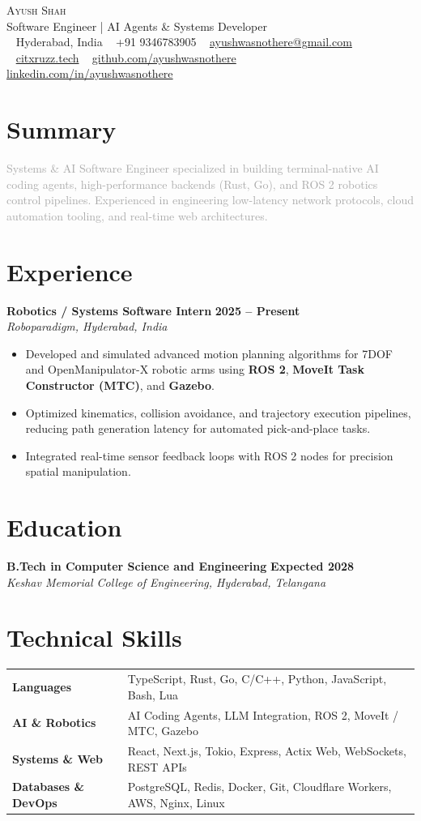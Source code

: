 \documentclass[a4paper,10pt]{article}
\makeatletter
\newcommand{\icon}[1]{\textcolor{lightgray}{#1}}
\newcommand{\resumeHeader}{
    \begin{center}
        {\Huge \scshape Ayush Shah}\\[4pt]
        \large\textcolor{midgray}{Software Engineer | AI Agents \& Systems Developer}\\[6pt]
        \small
        \icon{\faMapMarker} ~ Hyderabad, India \quad \textbullet \quad
        \icon{\faPhone} ~ +91 9346783905 \quad \textbullet \quad
        \icon{\faEnvelope} ~ \href{mailto:ayushwasnothere@gmail.com}{ayushwasnothere@gmail.com}\\[4pt]
        \icon{\faGlobe} ~ \href{https://citxruzz.tech}{citxruzz.tech} \quad \textbullet \quad
        \icon{\faGithub} ~ \href{https://github.com/ayushwasnothere}{github.com/ayushwasnothere} \quad \textbullet \quad
        \icon{\faLinkedin} ~ \href{https://linkedin.com/in/ayushwasnothere}{linkedin.com/in/ayushwasnothere}
    \end{center}
}
\makeatother
\begin{document}
\resumeHeader

\section*{Summary}
\textcolor{darkgray}{Systems & AI Software Engineer specialized in building terminal-native AI coding agents, high-performance backends (Rust, Go), and ROS 2 robotics control pipelines. Experienced in engineering low-latency network protocols, cloud automation tooling, and real-time web architectures.}

\section*{Experience}
\noindent\textbf{\large Robotics / Systems Software Intern} \hfill \textbf{2025 -- Present} \\
\textit{Roboparadigm, Hyderabad, India}
\begin{itemize}[leftmargin=1.2em, itemsep=2.5pt, topsep=2pt]
    \item Developed and simulated advanced motion planning algorithms for 7DOF and OpenManipulator-X robotic arms using \textbf{ROS 2}, \textbf{MoveIt Task Constructor (MTC)}, and \textbf{Gazebo}.
    \item Optimized kinematics, collision avoidance, and trajectory execution pipelines, reducing path generation latency for automated pick-and-place tasks.
    \item Integrated real-time sensor feedback loops with ROS 2 nodes for precision spatial manipulation.
\end{itemize}

\section*{Education}
\textbf{B.Tech in Computer Science and Engineering} \hfill \textbf{Expected 2028} \\
\textit{Keshav Memorial College of Engineering, Hyderabad, Telangana}

\section*{Technical Skills}
\begin{tabular}{@{}p{} p{}}
    \textbf{Languages} & TypeScript, Rust, Go, C/C++, Python, JavaScript, Bash, Lua \\
    \textbf{AI \& Robotics} & AI Coding Agents, LLM Integration, ROS 2, MoveIt / MTC, Gazebo \\
    \textbf{Systems \& Web} & React, Next.js, Tokio, Express, Actix Web, WebSockets, REST APIs \\
    \textbf{Databases \& DevOps} & PostgreSQL, Redis, Docker, Git, Cloudflare Workers, AWS, Nginx, Linux \\
\end{tabular}
\end{document}
